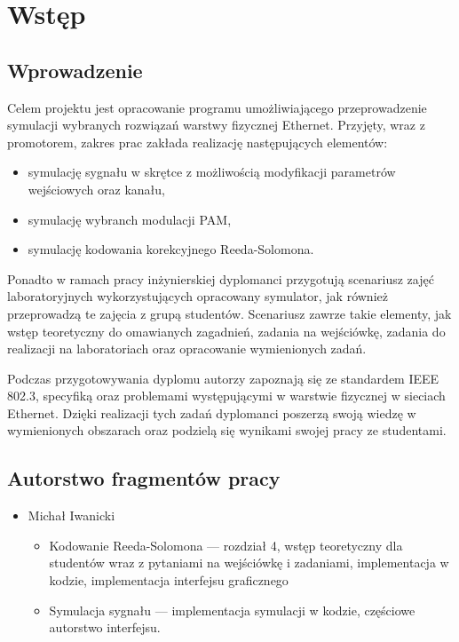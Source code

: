 \section{Wstęp}
\subsection{Wprowadzenie}

Celem projektu jest opracowanie programu umożliwiającego przeprowadzenie symulacji wybranych rozwiązań warstwy fizycznej Ethernet.
Przyjęty, wraz z promotorem, zakres prac zakłada realizację następujących elementów:
\begin{itemize}
    \item symulację sygnału w skrętce z możliwością modyfikacji parametrów wejściowych oraz kanału,
    \item symulację wybranch modulacji PAM,
    \item symulację kodowania korekcyjnego Reeda-Solomona.
\end{itemize}

Ponadto w ramach pracy inżynierskiej dyplomanci przygotują scenariusz zajęć laboratoryjnych wykorzystujących opracowany symulator, jak
również przeprowadzą te zajęcia z grupą studentów. Scenariusz zawrze takie elementy, jak wstęp teoretyczny do omawianych zagadnień,
zadania na wejściówkę, zadania do realizacji na laboratoriach oraz opracowanie wymienionych zadań.

Podczas przygotowywania dyplomu autorzy zapoznają się ze standardem IEEE 802.3, specyfiką oraz problemami występującymi w warstwie fizycznej
w sieciach Ethernet. Dzięki realizacji tych zadań dyplomanci poszerzą swoją wiedzę w wymienionych obszarach oraz podzielą się wynikami
swojej pracy ze studentami.

\subsection{Autorstwo fragmentów pracy}

\begin{itemize}
    \item Michał Iwanicki
    \begin{itemize}
        \item Kodowanie Reeda-Solomona --- rozdział 4, wstęp teoretyczny dla studentów
        wraz z pytaniami na wejściówkę i zadaniami, implementacja w kodzie,
        implementacja interfejsu graficznego
        \item Symulacja sygnału --- implementacja symulacji w kodzie, częściowe
        autorstwo interfejsu.
    \end{itemize}
\end{itemize}
